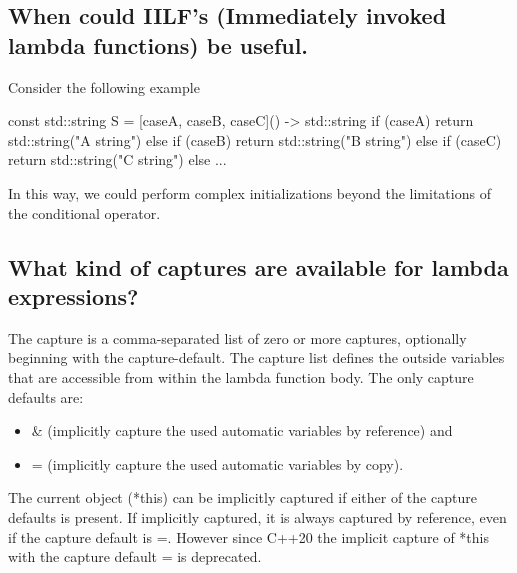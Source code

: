 \documentclass{report}
\begin{document}
\pagebreak 
{}
\bigbreak \noindent 
\subsection{When could IILF's (Immediately invoked lambda functions) be useful.}
\bigbreak \noindent 
Consider the following example
\bigbreak \noindent 
\begin{cppcode}
    const std::string S = [caseA, caseB, caseC]() -> std::string {
        if (caseA) {
            return std::string("A string")
        } else if (caseB) {
            return std::string("B string")
        } else if (caseC) {
            return std::string("C string")
        } else {
            ...
        }
    }
\end{cppcode}
\bigbreak \noindent 
In this way, we could perform complex initializations beyond the limitations of the conditional operator.

\bigbreak \noindent 
\subsection{What kind of captures are available for lambda expressions?}
\bigbreak \noindent 
The capture is a comma-separated list of zero or more captures, optionally beginning with the capture-default. The capture list defines the outside variables that are accessible from within the lambda function body.
\bigbreak \noindent 
The only capture defaults are:
\begin{itemize}
    \item \& (implicitly capture the used automatic variables by reference) and
    \item = (implicitly capture the used automatic variables by copy).
\end{itemize}
\bigbreak \noindent 
The current object (*this) can be implicitly captured if either of the capture defaults is present. If implicitly captured, it is always captured by reference, even if the capture default is =. However since C++20 the implicit capture of *this with the capture default = is deprecated.
\bigbreak \noindent 
\end{document}

